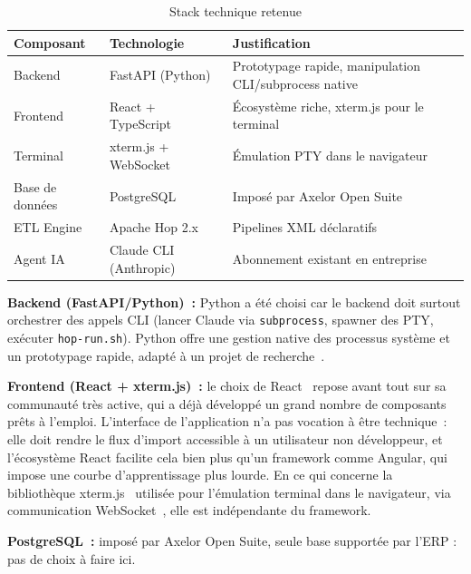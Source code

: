 \begin{table}[H]
  \centering
  \renewcommand{\arraystretch}{1.4}
  \begin{tabular}{p{3cm} p{4cm} p{6cm}}
    \toprule
    \rowcolor{gray!20}
    \textbf{Composant} & \textbf{Technologie} & \textbf{Justification} \\
    \midrule
    \rowcolor{gray!5}
    Backend   & FastAPI (Python)        & Prototypage rapide, manipulation CLI/subprocess native \\
    Frontend  & React + TypeScript      & Écosystème riche, xterm.js pour le terminal \\
    \rowcolor{gray!5}
    Terminal  & xterm.js + WebSocket    & Émulation PTY dans le navigateur \\
    Base de données & PostgreSQL        & Imposé par Axelor Open Suite \\
    \rowcolor{gray!5}
    ETL Engine & Apache Hop 2.x        & Pipelines XML déclaratifs \\
    Agent IA  & Claude CLI (Anthropic)  & Abonnement existant en entreprise \\
    \bottomrule
  \end{tabular}
  \caption{Stack technique retenue}
  \label{tab:stack-technique}
\end{table}

\textbf{Backend (FastAPI/Python)~:} Python a été choisi car le backend doit surtout orchestrer des appels CLI (lancer Claude via \texttt{subprocess}, spawner des PTY, exécuter \texttt{hop-run.sh}). Python offre une gestion native des processus système et un prototypage rapide, adapté à un projet de recherche~\cite{fastapi_doc}.

\textbf{Frontend (React + xterm.js)~:} le choix de React~\cite{react_doc} repose avant tout sur sa communauté très active, qui a déjà développé un grand nombre de composants prêts à l'emploi. L'interface de l'application n'a pas vocation à être technique~: elle doit rendre le flux d'import accessible à un utilisateur non développeur, et l'écosystème React facilite cela bien plus qu'un framework comme Angular, qui impose une courbe d'apprentissage plus lourde. En ce qui concerne la bibliothèque xterm.js~\cite{xtermjs} utilisée pour l'émulation terminal dans le navigateur, via communication WebSocket~\cite{websocket_rfc}, elle est indépendante du framework.

\textbf{PostgreSQL~:} imposé par Axelor Open Suite, seule base supportée par l'ERP : pas de choix à faire ici.

